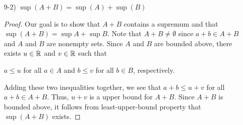 \documentclass[11pt,a4paper]{article}
\begin{document}
\begin{enumerate}
\begin{enumerate}
\begin{proof}
                 Now, let us show \( \inf(A+B) = \inf(A) + \inf(B) \). In order to show that \( \inf(A+B) = \inf(A) + \inf(B) \), we need to show that 
                \begin{enumerate}
                    \item[(i)] The set \( A + B   \) is bounded below by \( \inf(A) + \inf(B) \).
                    \item[(ii)] For every \( \epsilon > 0  \), there exists \( \varphi \in  A + B  \) such that  
                        \[  \varphi < \inf(A) + \inf(B) + \epsilon. \]
                \end{enumerate} 
                 Since \( A  \) and \( B  \) are nonempty and bounded below, we know that \( \inf (A)  \) and \( \inf (B)  \) exists by the greatest-lower-bound property. Thus, we can see that \( a \geq \inf A  \) for all \( a \in A  \) and \( b \geq \inf B  \) for all \( b \in B  \). Adding these two inequalities together results in
                \[  a + b \geq \inf(A) + \inf (B) \ \ \text{for all} \ a + b \in A + B,    \]
                which shows (i).
    Now, let \( \epsilon > 0 \). Using the lemma found in {\hyperref[Problem 3]{Problem 3}}, there exists an \( \alpha \in A  \) and \( \beta \in \beta  \) such that 
                \[  \alpha < \inf(A) + \frac{ \epsilon }{ 2 } \]
                and
                \[  \beta < \inf(B) + \frac{ \epsilon }{ 2 },  \]
                respectively. Adding these two inequalities, we get
                \[ \varphi =  \alpha + \beta < \inf(A) + \inf(B) + \epsilon \ \ \text{for some} \ \varphi \in A + B,  \]
                showing (ii).
                Thus, we conclude that \( \inf(A+B) = \inf(A) + \inf(B) \).  
            \end{proof}
        \item[9-2)] \( \sup (A + B) = \sup (A) + \sup (B) \) 

            \begin{proof}
                Our goal is to show that \( A + B  \) contains a supremum and that 
                 \( \sup(A+B) = \sup A + \sup B  \). Note that \( A + B \neq \emptyset  \) since \( a + b \in A + B \) and \( A  \) and \( B  \) are nonempty sets. Since \( A  \) and \( B  \) are bounded above, there exists \( u \in \mathbb{R}  \) and \( v \in \mathbb{R}  \) such that 
                 \begin{center}
                     \( a \leq u  \) for all \( a \in A  \) and \( b \leq v  \) for all \( b \in B  \), respectively.
                 \end{center}
                 Adding these two inequalities together, we see that \(  a + b \leq u + v  \) for all \( a + b \in A + B  \). Thus, \( u + v  \) is a upper bound for \( A + B  \). Since \( A + B  \) is bounded above, it follows from least-upper-bound property that \( \sup(A+B)  \) exists.   





\end{proof}
\end{enumerate}
\end{enumerate}
\end{document}
